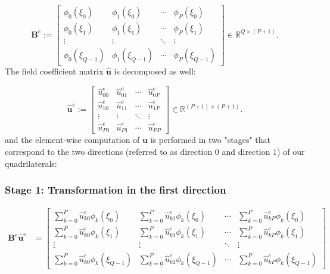 \begin{equation*}
\mathbf{B}^e :=
\begin{bmatrix}
\phi_0(\xi_0) & \phi_1(\xi_0) & \cdots & \phi_P(\xi_0) \\
\phi_0(\xi_1) & \phi_1(\xi_1) & \cdots & \phi_P(\xi_1) \\
\vdots      & \vdots      & \ddots & \vdots      \\
\phi_0(\xi_{Q-1}) & \phi_1(\xi_{Q-1}) & \cdots & \phi_P(\xi_{Q-1})
\end{bmatrix} 
\in \mathbb{R}^{Q \times (P+1)}.
\end{equation*}
The field coefficient matrix $\mathbf{\hat{u}}$ is decomposed as well:

\begin{equation*}
  \mathbf{\hat{u}}^e :=
\begin{bmatrix}
  \hat{u}_{00}^e & \hat{u}_{01}^e & \cdots & \hat{u}_{0P}^e \\
  \hat{u}_{10}^e & \hat{u}_{11}^e & \cdots & \hat{u}_{1P}^e \\
\vdots   & \vdots   & \ddots & \vdots   \\
\hat{u}_{P0}^e & \hat{u}_{P1}^e & \cdots & \hat{u}_{PP}^e
\end{bmatrix} \in \mathbb{R}^{(P+1) \times (P+1)}.
\end{equation*}
and the element-wise computation of $\mathbf{u}$ is performed in two "stages" that correspond to the two directions (referred to as direction $0$ and direction $1$) of our quadrilaterals:

\subsubsection*{Stage 1: Transformation in the first direction}
\begin{align*}
  \mathbf{B}^e \mathbf{\hat{u}}^e &=
\begin{bmatrix}
  \sum_{k=0}^P \hat{u}_{k0}^e\phi_k(\xi_0) & \sum_{k=0}^P \hat{u}_{k1}^e\phi_k(\xi_0) & \cdots & \sum_{k=0}^P \hat{u}_{kP}^e\phi_k(\xi_0) \\
  \sum_{k=0}^P \hat{u}_{k0}^e\phi_k(\xi_1) & \sum_{k=0}^P \hat{u}_{k1}^e\phi_k(\xi_1) & \cdots & \sum_{k=0}^P \hat{u}_{kP}^e\phi_k(\xi_1) \\
\vdots & \vdots & \ddots & \vdots \\
\sum_{k=0}^P \hat{u}_{k0}^e\phi_k(\xi_{Q-1}) & \sum_{k=0}^P \hat{u}_{k1}^e\phi_k(\xi_{Q-1}) & \cdots & \sum_{k=0}^P \hat{u}_{kP}^e\phi_k(\xi_{Q-1})
\end{bmatrix} 
\end{align*}

